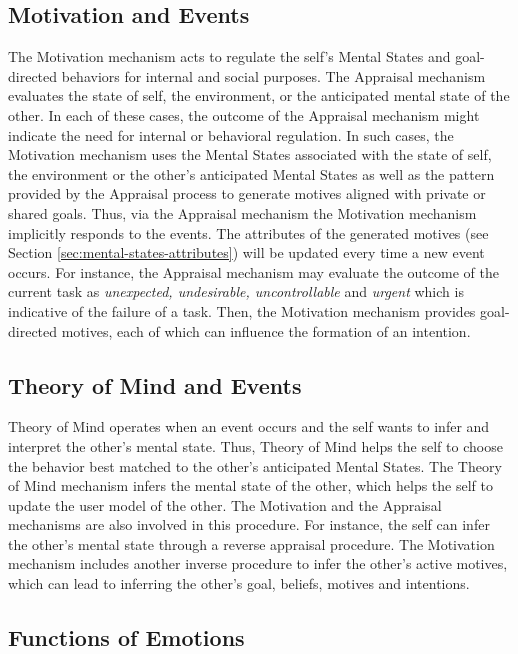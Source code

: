 \documentclass[12pt]{report}
\begin{document}
\subsection{Motivation and Events}
The Motivation mechanism acts to regulate the self's Mental States and
goal-directed behaviors for internal and social purposes. The Appraisal mechanism
evaluates the state of self, the environment, or the anticipated mental state of
the other. In each of these cases, the outcome of the Appraisal mechanism might
indicate the need for internal or behavioral regulation. In such cases, the
Motivation mechanism uses the Mental States associated with the state of self,
the environment or the other's anticipated Mental States as well as the pattern
provided by the Appraisal process to generate motives aligned with private or
shared goals. Thus, via the Appraisal mechanism the Motivation mechanism
implicitly responds to the events. The attributes of the generated motives (see
Section \ref{sec:mental-states-attributes}) will be updated every time a new
event occurs. For instance, the Appraisal mechanism may evaluate the outcome of
the current task as \textit{unexpected, undesirable, uncontrollable} and
\textit{urgent} which is indicative of the failure of a task. Then, the
Motivation mechanism provides goal-directed motives, each of which can
influence the formation of an intention.

\subsection{Theory of Mind and Events}
Theory of Mind operates when an event occurs and the self wants to infer and
interpret the other's mental state. Thus, Theory of Mind helps the self to
choose the behavior best matched to the other's anticipated Mental States.
The Theory of Mind mechanism infers the mental state of the other, which helps
the self to update the user model of the other. The Motivation and the Appraisal
mechanisms are also involved in this procedure. For instance, the self can infer
the other's mental state through a reverse appraisal procedure. The Motivation
mechanism includes another inverse procedure to infer the other's active
motives, which can lead to inferring the other's goal, beliefs, motives and
intentions.

\subsection{Functions of Emotions}
\label{sec:emotion-functions}
\end{document}
